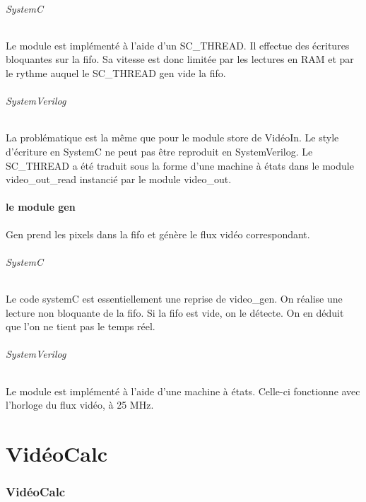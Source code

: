 \documentclass[a4paper,12pt]{report}
\begin{document}
\paragraph{SystemC}
Le module est implémenté à l'aide d'un SC\_THREAD.
Il effectue des écritures bloquantes sur la fifo. 
Sa vitesse est donc limitée par les lectures en RAM et
par le rythme auquel le SC\_THREAD gen vide la fifo.

\paragraph{SystemVerilog}
La problématique est la même que pour le module store de VidéoIn. 
Le style d'écriture en SystemC ne peut pas être reproduit en SystemVerilog.
Le SC\_THREAD a été traduit sous la forme d'une machine à états dans le module video\_out\_read instancié par le module video\_out.

\subsection{le module gen}
Gen prend les pixels dans la fifo et génère le flux vidéo correspondant.

\paragraph{SystemC}
Le code systemC est essentiellement une reprise de video\_gen.
On réalise une lecture non bloquante de la fifo. 
Si la fifo est vide, on le détecte. 
On en déduit que l'on ne tient pas le temps réel.

\paragraph{SystemVerilog}
Le module est implémenté à l'aide d'une machine à états.
Celle-ci fonctionne avec l'horloge du flux vidéo, à 25 MHz.






    \part{VidéoCalc} 
    \section*{VidéoCalc}

{}
\end{document}
